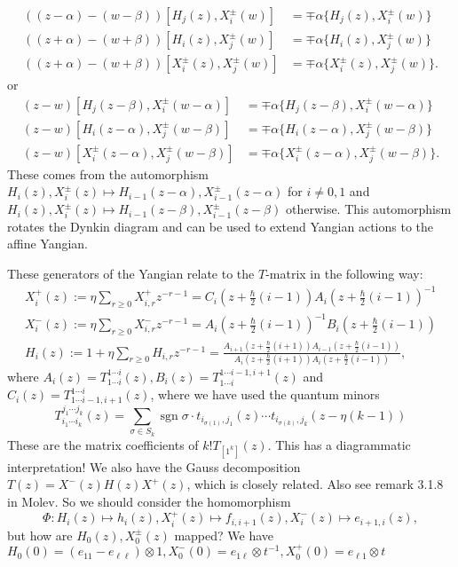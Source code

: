 \documentclass[11pt]{report}
\theoremstyle{definition}
\theoremstyle{remark}
\theoremstyle{remark}
\begin{document}
\begin{align*}
((z-\alpha)-(w-\beta))[H_j(z),X_i^\pm(w)] &= \mp \alpha \{ H_j(z),X_i^\pm(w) \} \\
((z+\alpha)-(w+\beta))[H_i(z),X_j^\pm(w)] &= \mp \alpha \{ H_i(z),X_j^\pm(w) \} \\
((z+\alpha)-(w+\beta))[X_i^\pm(z),X_j^\pm(w)] &= \mp \alpha \{ X_i^\pm(z),X_j^\pm(w) \}.
\end{align*}
or
\begin{align*}
(z-w)[H_j(z-\beta),X_i^\pm(w-\alpha)] &= \mp \alpha \{ H_j(z-\beta),X_i^\pm(w-\alpha) \} \\
(z-w)[H_i(z-\alpha),X_j^\pm(w-\beta)] &= \mp \alpha \{ H_i(z-\alpha),X_j^\pm(w-\beta) \} \\
(z-w)[X_i^\pm(z-\alpha),X_j^\pm(w-\beta)] &= \mp \alpha \{ X_i^\pm(z-\alpha),X_j^\pm(w-\beta) \}.
\end{align*}
These comes from the automorphism $H_i(z),X_i^\pm(z) \mapsto H_{i-1}(z-\alpha),X_{i-1}^\pm(z-\alpha)$ for $i \neq 0,1$ and $H_i(z),X_i^\pm(z) \mapsto H_{i-1}(z-\beta),X_{i-1}^\pm(z-\beta)$ otherwise. This automorphism rotates the Dynkin diagram and can be used to extend Yangian actions to the affine Yangian.

These generators of the Yangian relate to the $T$-matrix in the following way:
\begin{align*}
X_i^+(z) := \eta \sum_{r \geq 0} X_{i,r}^+ z^{-r-1} = C_i(z+\tfrac{\hbar}{2}(i-1)) A_i(z+\tfrac{\hbar}{2}(i-1))^{-1} \\
X_i^-(z) := \eta \sum_{r \geq 0} X_{i,r}^- z^{-r-1} = A_i(z+\tfrac{\hbar}{2}(i-1))^{-1} B_i(z+\tfrac{\hbar}{2}(i-1)) \\
H_i(z) := 1 + \eta \sum_{r \geq 0} H_{i,r} z^{-r-1} = \frac{A_{i+1}(z+\tfrac{\hbar}{2}(i+1)) A_{i-1}(z+\tfrac{\hbar}{2}(i-1))}{A_i(z+\tfrac{\hbar}{2}(i+1)) A_i(z+\tfrac{\hbar}{2}(i-1))},
\end{align*}
where $A_i(z) = T_{1 \cdots i}^{1 \cdots i}(z), B_i(z) = T_{1\cdots i}^{1 \cdots i-1,i+1}(z)$ and $C_i(z) = T^{1\cdots i}_{1 \cdots i-1,i+1}(z)$, where we have used the quantum minors
\begin{equation*}
T_{i_1 \cdots i_k}^{j_1 \cdots j_k}(z) = \sum_{\sigma \in S_k} \operatorname{sgn} \sigma \cdot t_{i_{\sigma(1)},j_1}(z) \cdots t_{i_{\sigma(k)},j_k}(z-\eta(k-1))
\end{equation*}
These are the matrix coefficients of $k! T_{[1^k]}(z)$. This has a diagrammatic interpretation! We also have the Gauss decomposition $T(z) = X^-(z) H(z) X^+(z)$, which is closely related. Also see remark 3.1.8 in Molev. So we should consider the homomorphism
\begin{equation*}
\Phi: H_i(z) \mapsto h_i(z), X_i^+(z) \mapsto f_{i,i+1}(z), X_i^-(z) \mapsto e_{i+1,i}(z),
\end{equation*}
but how are $H_0(z),X_0^\pm(z)$ mapped? We have $H_0(0) = (e_{11}-e_{\ell\ell}) \otimes 1, X_0^-(0) = e_{1\ell} \otimes t^{-1}, X_0^+(0) = e_{\ell 1} \otimes t$
\end{document}
